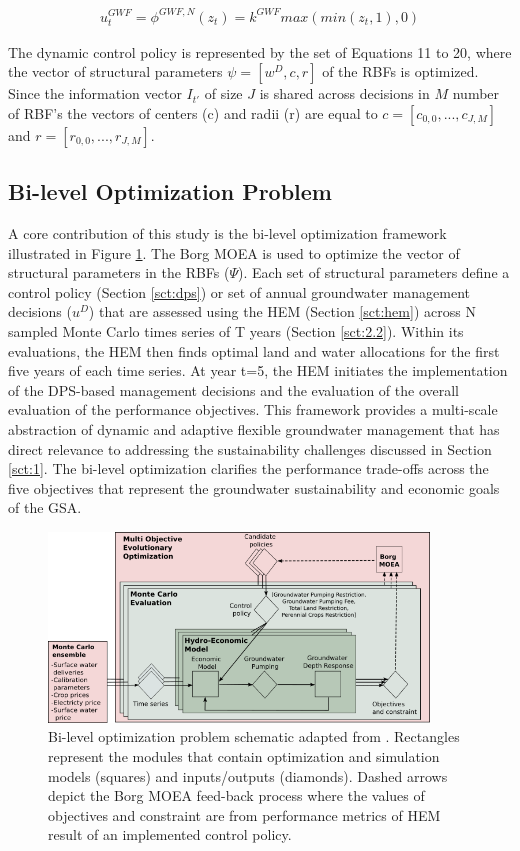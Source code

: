 \documentclass[a4paper,fleqn]{cas-sc}
\begin{document}
\begin{align}\label{eq:20}
u^{GWF}_t = \phi^{GWF,N}(z_{t}) = k^{GWF}max(min(z_{t},1),0)
\end{align}

The dynamic control policy is represented by the set of Equations 11 to 20, where the vector of structural parameters $\psi = [w^{D},c,r]$ of the RBFs is optimized. Since the information vector $I_{t'}$ of size $J$ is shared across decisions in $M$ number of RBF's the vectors of centers (c) and radii (r) are equal to $c=[c_{0,0},...,c_{J,M}]$ and $r=[r_{0,0},...,r_{J,M}]$.

\clearpage

\subsection{Bi-level Optimization Problem}\label{sct:3.2}

A core contribution of this study is the bi-level optimization framework illustrated in Figure \ref{fig:4}. The Borg MOEA \citep{hadka_borg_2013,gupta_can_2020} is used to optimize the vector of structural parameters in the RBFs ($\Psi$). Each set of structural parameters define a control policy (Section \ref{sct:dps}) or set of annual groundwater management decisions ($u^{D}$) that are assessed using the HEM (Section \ref{sct:hem}) across N sampled Monte Carlo times series of T years (Section \ref{sct:2.2}). Within its evaluations, the HEM then finds optimal land and water allocations for the first five years of each time series. At year t=5, the HEM initiates the implementation of the DPS-based management decisions and the evaluation of the overall evaluation of the performance objectives. This framework provides a multi-scale abstraction of dynamic and adaptive flexible groundwater management that has direct relevance to addressing the sustainability challenges discussed in Section \ref{sct:1}. The bi-level optimization clarifies the performance trade-offs across the five objectives that represent the groundwater sustainability and economic goals of the GSA. 

\begin{figure}[pos=hbt!]
    \includegraphics[width=0.9\textwidth,center]{Diagram2}
    \caption{Bi-level optimization problem schematic adapted from \citet{hamilton_stream_2022}. Rectangles represent the modules that contain optimization and simulation models (squares) and inputs/outputs (diamonds). Dashed arrows depict the Borg MOEA feed-back process where the values of objectives and constraint are from performance metrics of HEM result of an implemented control policy.}
    \label{fig:4}
\end{figure}
\end{document}
